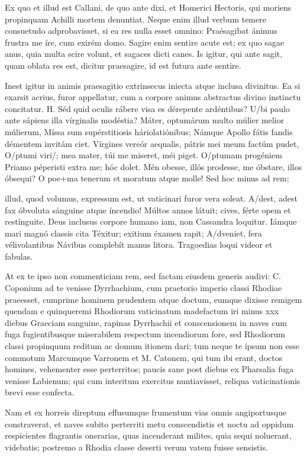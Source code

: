 Ex quo et illud est Callani, de quo ante dixi, et Homerici Hectoris, qui moriens propinquam Achilli mortem denuntiat. Neque enim illud verbum temere consuetudo adprobavisset, si ea res nulla esset omnino: Praésagibat ánimus frustra me íre, cum exirém domo. Sagire enim sentire acute est; ex quo sagae anus, quia multa scire volunt, et sagaces dicti canes. Is igitur, qui ante sagit, quam oblata res est, dicitur praesagire, id est futura ante sentire.

 Inest igitur in animis praesagitio extrinsecus iniecta atque inclusa divinitus. Ea si exarsit acrius, furor appellatur, cum a corpore animus abstractus divino instinctu concitatur. H. Séd quid oculis rábere visa es dérepente ardéntibus? U/bi paulo ante sápiens illa vírginalis modéstia? Máter, optumárum multo múlier melior múlierum, Míssa sum supérstitiosis háriolatiónibus; Námque Apollo fátis fandis démentem invitám ciet. Vírgines vereór aequalis, pátris mei meum factúm pudet, O/ptumi viri/; mea mater, túi me miseret, méi piget. O/ptumam progéniem Priamo péperisti extra me; hóc dolet. Mén obesse, illós prodesse, me óbstare, illos óbsequi? O poe+ma tenerum et moratum atque molle! Sed hoc minus ad rem;

 illud, quod volumus, expressum est, ut vaticinari furor vera soleat. A/dest, adest fax óbvoluta sánguine atque íncendio! Múltos annos látuit; cives, férte opem et restínguite. Deus inclusus corpore humano iam, non Cassandra loquitur. Iámque mari magnó classis cita Téxitur; exitium éxamen rapit; A/dveniet, fera vélivolantibus Návibus complebít manus litora. Tragoedias loqui videor et fabulas.

 At ex te ipso non commenticiam rem, sed factam eiusdem generis audivi: C. Coponium ad te venisse Dyrrhachium, cum praetorio imperio classi Rhodiae praeesset, cumprime hominem prudentem atque doctum, eumque dixisse remigem quendam e quinqueremi Rhodiorum vaticinatum madefactum iri minus xxx diebus Graeciam sanguine, rapinas Dyrrhachii et conscensionem in naves cum fuga fugientibusque miserabilem respectum incendiorum fore, sed Rhodiorum classi propinquum reditum ac domum itionem dari; tum neque te ipsum non esse commotum Marcumque Varronem et M. Catonem, qui tum ibi erant, doctos homines, vehementer esse perterritos; paucis sane post diebus ex Pharsalia fuga venisse Labienum; qui cum interitum exercitus nuntiavisset, reliqua vaticinationis brevi esse confecta.

 Nam et ex horreis direptum effusumque frumentum vias omnis angiportusque constraverat, et naves subito perterriti metu conscendistis et noctu ad oppidum respicientes flagrantis onerarias, quas incenderant milites, quia sequi noluerant, videbatis; postremo a Rhodia classe deserti verum vatem fuisse sensistis.

